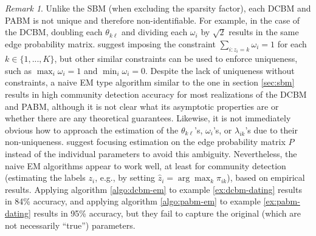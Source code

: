 \documentclass[
  12pt,
]{article}
\theoremstyle{definition}
\theoremstyle{definition}
\theoremstyle{definition}
\theoremstyle{definition}
\theoremstyle{remark}
\newtheorem{remark}{Remark}
\begin{document}
\begin{remark}
Unlike the SBM (when excluding the sparsity factor), each DCBM and PABM is not unique and therefore non-identifiable. 
For example, in the case of the DCBM, doubling each $\theta_{k \ell}$ and dividing each $\omega_i$ by $\sqrt{2}$ results in the same edge probability matrix. 
\citet{Karrer_2011} suggest imposing the constraint $\sum_{i : z_i = k} \omega_i = 1$ for each $k \in \{1, ..., K\}$, but other similar constraints can be used to enforce uniqueness, such as $\max_i \omega_i = 1$ and $\min_i \omega_i = 0$. 
Despite the lack of uniqueness without constraints, a naive EM type algorithm similar to the one in section \ref{sec:sbm} results in high community detection accuracy for most realizations of the DCBM and PABM, although it is not clear what its asymptotic properties are or whether there are any theoretical guarantees. 
Likewise, it is not immediately obvious how to approach the estimation of the $\theta_{k \ell}$'s, $\omega_i$'s, or $\lambda_{ik}$'s due to their non-uniqueness. 
\citet{noroozi2019estimation} suggest focusing estimation on the edge probability matrix $P$ instead of the individual parameters to avoid this ambiguity. 
Nevertheless, the naive EM algorithms appear to work well, at least for community detection (estimating the labels $z_i$, e.g., by setting $\hat{z}_i = \arg\max_k \pi_{ik}$), based on empirical results. 
Applying algorithm \ref{algo:dcbm-em} to example \ref{ex:dcbm-dating} results in 84\% accuracy, and applying algorithm \ref{algo:pabm-em} to example \ref{ex:pabm-dating} results in 95\% accuracy, but they fail to capture the original (which are not necessarily ``true'') parameters. 
\end{remark}
\end{document}
